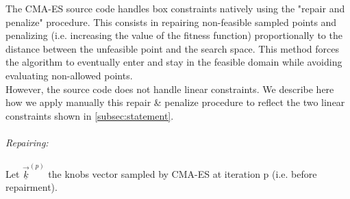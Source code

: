The CMA-ES source code handles box constraints natively using the "repair and penalize" procedure. This consists in repairing non-feasible sampled points and penalizing (i.e. increasing the value of the fitness function) proportionally to the distance between the unfeasible point and the search space. This method forces the algorithm to eventually enter and stay in the feasible domain while avoiding evaluating non-allowed points.\\
However, the source code does not handle linear constraints. We describe here how we apply manually this repair \& penalize procedure to reflect the two linear constraints shown in \ref{subsec:statement}.\\
\\

%
\emph{Repairing:}\\
\\
Let $\underline{\vec{k}}^{(p)}$ the knobs vector sampled by CMA-ES at iteration p (i.e. before repairment).\\

